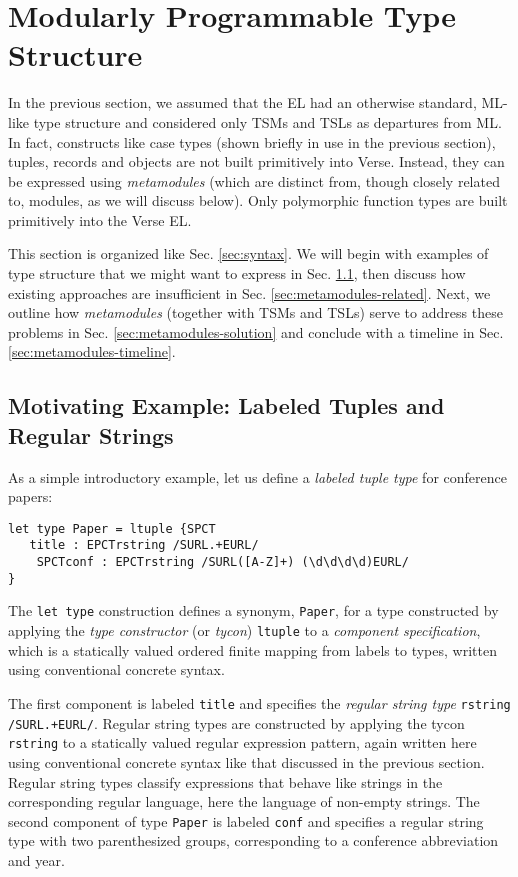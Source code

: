 
\section{Modularly Programmable Type Structure}\label{sec:metamodules}
In the previous section, we assumed that the EL had an otherwise standard, ML-like type structure and considered only TSMs and TSLs as departures from ML. In fact, constructs like case types (shown briefly in use in the previous section), tuples, records and objects are not built primitively into Verse. Instead, they can be expressed using \emph{metamodules} (which are distinct from, though closely related to, {modules}, as we will discuss below). Only polymorphic function types are built primitively into the Verse EL.

This section is organized like Sec. \ref{sec:syntax}. We will begin with examples of type structure that we might want to express in Sec. \ref{sec:metamodules-example}, then discuss how existing approaches are insufficient in Sec. \ref{sec:metamodules-related}. Next, we outline how \emph{metamodules} (together with TSMs and TSLs) serve to address these problems in Sec. \ref{sec:metamodules-solution} and conclude with a timeline in Sec. \ref{sec:metamodules-timeline}.

\subsection{Motivating Example: Labeled Tuples and Regular Strings}\label{sec:metamodules-example}
As a simple introductory example, let us define a \emph{labeled tuple type} for conference papers:
\begin{lstlisting}[numbers=none]
let type Paper = ltuple {SPCT
   title : EPCTrstring /SURL.+EURL/
    SPCTconf : EPCTrstring /SURL([A-Z]+) (\d\d\d\d)EURL/
}
\end{lstlisting}
The \lstinline{let type} construction defines a synonym, \lstinline{Paper}, for a type constructed by applying the \emph{type constructor} (or \emph{tycon}) \lstinline{ltuple} to a \emph{component specification}, which is a  statically valued ordered finite mapping from labels to types, written using conventional concrete syntax.

The first component is labeled \lstinline{title} and specifies the \emph{regular string type} \lstinline{rstring /SURL.+EURL/}. Regular string types are constructed by applying the tycon \lstinline{rstring} to a statically valued regular expression pattern, again written here using conventional concrete syntax like that discussed in the previous section. Regular string types classify expressions that behave like strings in the corresponding regular language, here the language of non-empty strings. The second component of type \lstinline{Paper} is labeled \lstinline{conf} and specifies a regular string type with two {parenthesized groups}, corresponding to a conference abbreviation and year.

